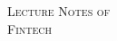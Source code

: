\documentclass[10pt,a4paper,twoside,openright]{book}
\begin{document}
\frontmatter

\pagestyle{empty}
\vspace*{\fill}
\begin{center}
	{\large \textsc{Lecture Notes of}}\\
	\vspace*{0.4cm}
	{\Huge \textsc{Fintech}}
\end{center}
\vspace*{\fill}
\cleardoublepage

\tableofcontents
\cleardoublepage

\setcounter{page}{1}
\mainmatter


\end{document}

